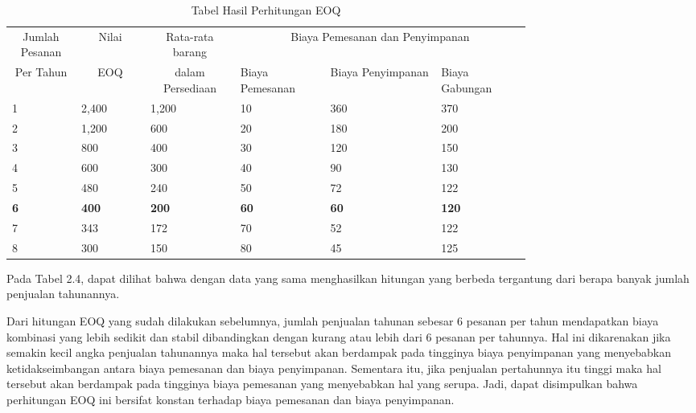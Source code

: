 \begin{table}[h!]
	\caption{Tabel Hasil Perhitungan EOQ}
	\label{tab:table2}
	\begin{tabular}{|m{0.1\linewidth}|m{0.1\linewidth}|m{0.13\linewidth}|m{0.13\linewidth}|m{0.16\linewidth}|m{0.13\linewidth}|} %
	\hline
	\multicolumn{1}{|c|}{Jumlah Pesanan} & \multicolumn{1}{|c|}{Nilai} & \multicolumn{1}{|c|}{Rata-rata barang} & \multicolumn{3}{c|}{Biaya Pemesanan dan Penyimpanan} \\
	\cline{4-6}
	\multicolumn{1}{|c|}{Per Tahun} & \multicolumn{1}{|c|}{EOQ} & \multicolumn{1}{|c|}{dalam Persediaan} & Biaya Pemesanan & Biaya Penyimpanan & Biaya Gabungan \\
	\hline
		1 & 2,400 & 1,200 & 10 & 360 & 370\\ \hline
		2 & 1,200 & 600 & 20 & 180 & 200\\ \hline
		3 & 800 & 400 & 30 & 120 & 150\\ \hline
		4 & 600 & 300 & 40 & 90 & 130\\ \hline
		5 & 480 & 240 & 50 & 72 & 122\\ \hline
		\textbf{6} & \textbf{400} & \textbf{200} & \textbf{60} & \textbf{60} & \textbf{120}\\ \hline
		7 & 343 & 172 & 70 & 52 & 122\\ \hline
		8 & 300 & 150 & 80 & 45 & 125\\ \hline
	\end{tabular}
\end{table}


Pada Tabel 2.4, dapat dilihat bahwa dengan data yang sama menghasilkan hitungan yang berbeda tergantung dari berapa banyak jumlah penjualan tahunannya.

Dari hitungan EOQ yang sudah dilakukan sebelumnya, jumlah penjualan tahunan sebesar 6 pesanan per tahun mendapatkan biaya kombinasi yang lebih sedikit dan stabil dibandingkan dengan kurang atau lebih dari 6 pesanan per tahunnya. Hal ini dikarenakan jika semakin kecil angka penjualan tahunannya maka hal tersebut akan berdampak pada tingginya biaya penyimpanan yang menyebabkan ketidakseimbangan antara biaya pemesanan dan biaya penyimpanan. Sementara itu, jika penjualan pertahunnya itu tinggi maka hal tersebut akan berdampak pada tingginya biaya pemesanan yang menyebabkan hal yang serupa. Jadi, dapat disimpulkan bahwa perhitungan EOQ ini bersifat konstan terhadap biaya pemesanan dan biaya penyimpanan.


